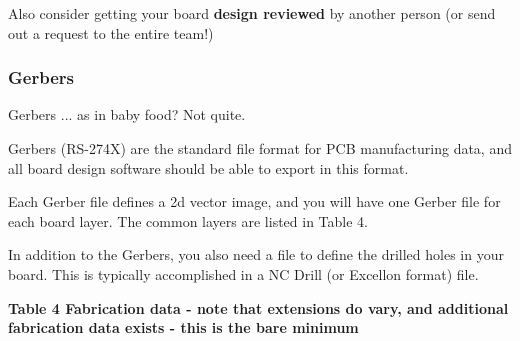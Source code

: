 \documentclass[letterpaper]{article}
\begin{document}
{\sffamily\color[rgb]{0.30980393,0.5058824,0.7411765}
Also consider getting your board \textbf{design reviewed} by another person (or send out a request to the entire team!)}

\subsubsection{Gerbers}
\hypertarget{Toc337742688}{}{\sffamily\color[rgb]{0.30980393,0.5058824,0.7411765}
Gerbers ... as in baby food? Not quite.}

{\sffamily\color[rgb]{0.30980393,0.5058824,0.7411765}
Gerbers (RS-274X) are the standard file format for PCB manufacturing data, and all board design software should be able
to export in this format.}

{\sffamily\color[rgb]{0.30980393,0.5058824,0.7411765}
Each Gerber file defines a 2d vector image, and you will have one Gerber file for each board layer. The common layers
are listed in Table 4.}

{\sffamily\color[rgb]{0.30980393,0.5058824,0.7411765}
In addition to the Gerbers, you also need a file to define the drilled holes in your board. This is typically
accomplished in a NC Drill (or Excellon format) file.}


\bigskip

{\sffamily\bfseries\color[rgb]{0.30980393,0.5058824,0.7411765}
Table 4 Fabrication data - note that extensions do vary, and additional fabrication data exists - this is the bare
minimum}
\end{document}
